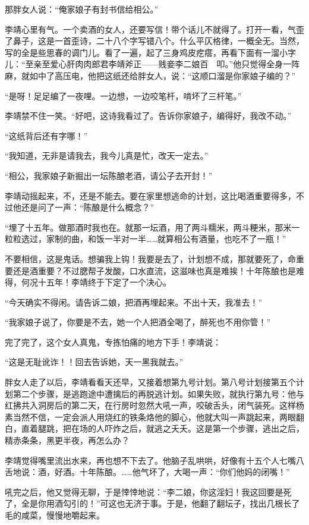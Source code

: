 那胖女人说：“俺家娘子有封书信给相公。”

李靖心里有气。一个卖酒的女人，还要写信！带个话儿不就得了。打开一看，气歪了鼻子，这是一首歪诗，二十八个字写错八个。什么平仄格律，一概全无。当然，写的全是些思春的调门儿。看了一遍，起了三身鸡皮疙瘩，再看下面有一溜小字儿：“至亲至爱心肝肉肉郎君李靖斧正——贱妾李二娘百　叩。”他只觉得全身一阵麻，就如中了高压电，他把这纸还给胖女人，说：“这顺口溜是你家娘子编的？”

“是呀！足足编了一夜哩。一边想，一边咬笔杆，啃坏了三杆笔。”

李靖禁不住一笑。“好吧，这诗我看过了。告诉你家娘子，编得好，我改不动。”

“这纸背后还有字哪！”

“我知道，无非是请我去，我今儿真是忙，改天一定去。”

“相公，我家娘子新掘出一坛陈酿老酒，请公子去开封！”

李靖动摇起来，不，还是不能去。要在家里想逃命的计划，这比喝酒重要得多，不过他还是问了一声：“陈酿是什么概念？”

“埋了十五年。做那酒时我也在。就那一坛酒，用了两斗糯米，两斗粳米，那米一粒粒选过，家制的曲，和饭一半对一半……就算相公有酒量，也吃不了一瓶！”

不要相信，这是鬼话。想骗我上钩！我要是去了，计划想不成，那就要死了，命重要还是酒重要？不过腮帮子发酸，口水直流，这滋味也真是难挨！十年陈酿也是难得，何况十五年！李靖终于下定了一个决心。

“今天确实不得闲。请告诉二娘，把酒再埋起来。不出十天，我准去！”

“我家娘子说了，你要是不去，她一个人把酒全喝了，醉死也不用你管！”

完了完了，这个女人真鬼，专拣怕痛的地方下手！李靖说：

“这是无耻讹诈！！回去告诉她，天一黑我就去。”

胖女人走了以后，李靖看看天还早，又接着想第九号计划。第八号计划接第五个计划第二个步骤，是逃跑途中遭擒后的再脱逃计划。如果失败，就执行第九号：他与红拂共入洞房后的第二天，在行房时忽然大吼一声，咬破舌头，闭气装死。这样杨素当然不信，一定会派人用烧红的铁条烙他的脚心，他就大叫一声跳起来，两眼翻白，直着腿跳，把在场的人吓炸之后，就逃之夭夭。这是第一个步骤，逃出之后，精赤条条，黑更半夜，再怎么办？

李靖觉得嘴里流出水来，再也想不下去了。他脑子乱哄哄，好像有十五个人七嘴八舌地说：酒，好酒。十年陈酿。……他气坏了，大喝一声：“你们他妈的闭嘴！”

吼完之后，他又觉得无聊，于是悻悻地说：“李二娘，你这淫妇！我这回要是死了，全是你用酒勾引的！”可这也无济于事。于是，他翻了翻坛子，找出几根长了毛的咸菜，慢慢地嚼起来。

